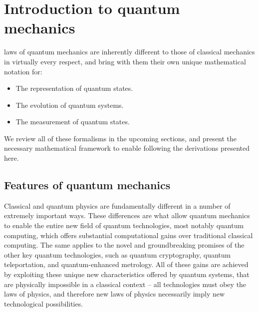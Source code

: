 %
%

\section{Introduction to quantum mechanics}\label{sec:intro_to_QM}

\newline

 laws of quantum mechanics are inherently different to those of classical mechanics in virtually every respect, and bring with them their own unique mathematical notation for:
\begin{itemize}
	\item The representation of quantum states.
	\item The evolution of quantum systems.
	\item The measurement of quantum states.
\end{itemize}

\noindent We review all of these formalisms in the upcoming sections, and present the necessary mathematical framework to enable following the derivations presented here.

%
%

\subsection{Features of quantum mechanics}

Classical and quantum physics are fundamentally different in a number of extremely important ways. These differences are what allow quantum mechanics to enable the entire new field of quantum technologies, most notably quantum computing, which offers substantial computational gains over traditional classical computing. The same applies to the novel and groundbreaking promises of the other key quantum technologies, such as quantum cryptography, quantum teleportation, and quantum-enhanced metrology. All of these gains are achieved by exploiting these unique new characteristics offered by quantum systems, that are physically impossible in a classical context -- all technologies must obey the laws of physics, and therefore new laws of physics necessarily imply new technological possibilities.

